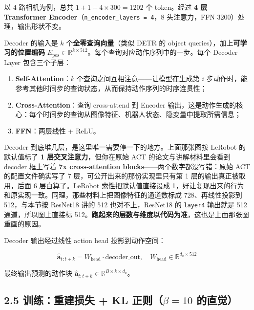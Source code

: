 \documentclass[
  chinese,
]{ctexart}
\providecommand{\tightlist}{%
  \setlength{\itemsep}{0pt}\setlength{\parskip}{0pt}}
\begin{document}
以 4 路相机为例，总共 \(1 + 1 + 4 \times 300 = 1202\) 个 token。经过
\textbf{4 层 Transformer Encoder}（\texttt{n\_encoder\_layers\ =\ 4}，8
头注意力，FFN 3200）处理，输出形状不变。

Decoder 的输入是 \(k\) 个\textbf{全零查询向量}（类似 DETR 的 object
queries），加上\textbf{可学习的位置编码}
\(E_{\text{pos}} \in \mathbb{R}^{k \times 512}\)。每个查询对应动作序列中的一步。每个
Decoder Layer 包含三个子层：

\begin{enumerate}
\def\labelenumi{\arabic{enumi}.}
\tightlist
\item
  \textbf{Self-Attention}：\(k\) 个查询之间互相注意------让模型在生成第
  \(i\)
  步动作时，能参考其他时间步的查询状态，从而保持动作序列的时序连贯性；
\item
  \textbf{Cross-Attention}：查询 cross-attend 到 Encoder
  输出，这是动作生成的核心：每个时间步的查询从图像特征、机器人状态、隐变量中提取所需信息；
\item
  \textbf{FFN}：两层线性 + ReLU。
\end{enumerate}

Decoder 到底堆几层，是这里唯一需要停一下的地方。上面那张图按 LeRobot
的默认值标了 \textbf{1 层交叉注意力}，但你在原始 ACT
的论文与讲解材料里会看到 decoder 框上写着 \textbf{7x cross-attention
blocks}------两个数字都没写错：原始 ACT 的配置文件确实写了 7
层，可公开出来的那份实现里只有第 1 层的输出真正被取用，后面 6
层白算了。LeRobot 索性把默认值直接设成
1，好让复现出来的行为和原实现一致。同理，那些材料上把图像特征的通道数标成
728、再线性投影到 512，与本节按 ResNet18 讲的 512 也对不上，ResNet18 的
\texttt{layer4} 输出就是 512 通道，所以图上直接标
512。\textbf{跑起来的层数与维度以代码为准}，这也是上面那张图重画的原因。

Decoder 输出经过线性 action head 投影到动作空间：

\[
\hat{\mathbf{a}}_{t:t+k} = W_{\text{head}} \cdot \text{decoder\_out}, \quad W_{\text{head}} \in \mathbb{R}^{d_a \times 512}
\]

最终输出预测的动作块
\(\hat{\mathbf{a}}_{t:t+k} \in \mathbb{R}^{B \times k \times d_a}\)。

\subsection{\texorpdfstring{2.5 训练：重建损失 + KL 正则（\(\beta=10\)
的直觉）}{2.5 训练：重建损失 + KL 正则（\textbackslash beta=10 的直觉）}}\label{ux8badux7ec3ux91cdux5efaux635fux5931-kl-ux6b63ux5219beta10-ux7684ux76f4ux89c9}
\end{document}
